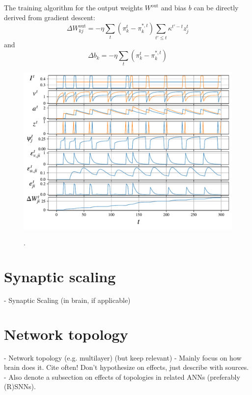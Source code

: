         The training algorithm for the output weights $W^\text{out}$ and bias $b$ can be directly derived from gradient descent:
        \begin{equation}
        \Delta W^\text{out}_{kj} = -\eta \sum_t\left(\pi^t_k - \pi^{*,t}_k\right)\sum_{t'\leq t}\kappa^{t'-t}z^t_j
        \end{equation}
        and
        \begin{equation}
        \Delta b_k = -\eta \sum_t\left(\pi^t_k - \pi^{*,t}_k\right)
        \end{equation}

        \begin{figure}[ht]
            \centering
            \includegraphics[width=\linewidth]{gfx/alif}
            \label{fig:alif}
            \caption{.}
        \end{figure}

\section{Synaptic scaling}

    \begin{tcolorbox}[colback=orange]
    - Synaptic Scaling (in brain, if applicable)

    \end{tcolorbox}


\section{Network topology}

    \begin{tcolorbox}[colback=orange]
      - Network topology (e.g. multilayer) (but keep relevant)
      - Mainly focus on how brain does it. Cite often! Don't hypothesize on effects, just describe with sources.
      - Also denote a subsection on effects of topologies in related ANNs (preferably (R)SNNs).

    \end{tcolorbox}
